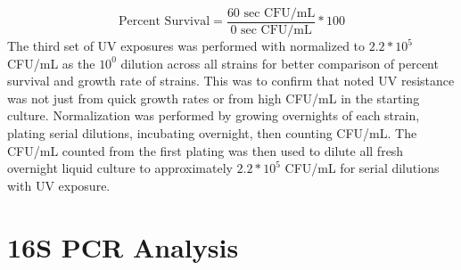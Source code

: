 \documentclass[12pt,twoside]{reedthesis}
\begin{document}
\begin{equation} 
  \text{Percent Survival} = \frac{\text{60 sec CFU/mL}}{\text{0 sec CFU/mL}} * 100%
  \label{eq:psurvival}
\end{equation}
The third set of UV exposures was performed with normalized to \(2.2*10^5\) CFU/mL as the \(10^0\) dilution across all strains for better comparison of percent survival and growth rate of strains. This was to confirm that noted UV resistance was not just from quick growth rates or from high CFU/mL in the starting culture. Normalization was performed by growing overnights of each strain, plating serial dilutions, incubating overnight, then counting CFU/mL. The CFU/mL counted from the first plating was then used to dilute all fresh overnight liquid culture to approximately \(2.2*10^5\) CFU/mL for serial dilutions with UV exposure.

\hypertarget{s-pcr-analysis}{%
\section{16S PCR Analysis}\label{s-pcr-analysis}}
\end{document}
